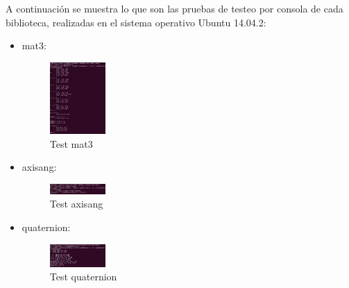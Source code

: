 \documentclass[main.tex]{subfiles}
\begin{document}
A continuación se muestra lo que son las pruebas de testeo por consola de cada biblioteca, realizadas en el sistema operativo Ubuntu 14.04.2:

\begin{itemize}
\item mat3: 
    \begin{figure}[h]
      \centering
      \includegraphics[width=0.2\textwidth]{../img/test_mat3.jpg}
      \caption{Test mat3}
      \label{test_mat3}
    \end{figure}
\item axisang:
    \begin{figure}[h]
      \centering
      \includegraphics[width=0.2\textwidth]{../img/test_axisang.jpg}
      \caption{Test axisang}
      \label{test_axisang}
    \end{figure}
\item quaternion:
    \begin{figure}[h]
      \centering
      \includegraphics[width=0.2\textwidth]{../img/test_quaternion.jpg}
      \caption{Test quaternion}
      \label{test_quaternion}
    \end{figure}
\end{itemize}
\end{document}
